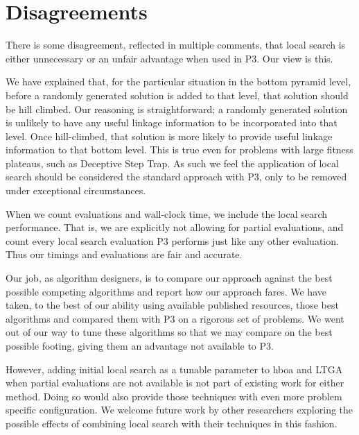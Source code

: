 \documentclass[]{article}
\begin{document}
\section{Disagreements}

There is some disagreement, reflected in multiple comments, that local search is either unnecessary or an unfair advantage when used in P3. Our view is this.

We have explained that, for the particular situation in the bottom pyramid level,
before a randomly generated solution is added to that level, that solution should be hill climbed.
Our reasoning is straightforward; a randomly generated solution is unlikely to
have any useful linkage information to be incorporated into that level.
Once hill-climbed, that solution is more likely to provide useful linkage information to that bottom level.
This is true even for problems with large fitness plateaus, such as Deceptive Step Trap.
As such we feel the application of local search should be considered the standard approach
with P3, only to be removed under exceptional circumstances.

When we count evaluations and wall-clock time, we include the local search performance. That is, we are explicitly not allowing for partial evaluations, and count every local search evaluation P3 performs just like any other evaluation. Thus our timings and evaluations are fair and accurate.

Our job, as algorithm designers, is to compare our approach against the best possible competing algorithms
and report how our approach fares. We have taken, to the best of our ability using available published resources,
those best algorithms and compared them with P3 on a rigorous set of problems.
We went out of our way to tune these algorithms
so that we may compare on the best possible footing, giving them an advantage not available to P3.

However, adding initial local search as a tunable parameter to hboa and LTGA when partial evaluations are not available is not part
of existing work for either method. Doing so would also provide those techniques
with even more problem specific configuration. We welcome future work by other researchers exploring the possible effects of combining
local search with their techniques in this fashion.
\end{document}
